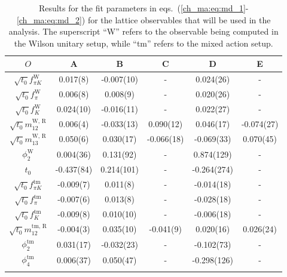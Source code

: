 \begin{longtable}{c | c c c c c}
\label{ch_ma:tab:md}
    ${O}$ & A & B & C & D & E \\
    \toprule
    $\sqrt{t_0}f_{\pi K}^{\textrm{W}}$ & 0.017(8) & -0.007(10) & - & 0.024(26) & - \\ 
    $\sqrt{t_0}f_{\pi}^{\textrm{W}}$ & 0.006(8) & 0.008(9) & - & 0.020(26) & - \\ 
    $\sqrt{t_0}f_{K}^{\textrm{W}}$ & 0.024(10) & -0.016(11) & - & 0.022(27) & - \\ 
    $\sqrt{t_0}m_{12}^{\textrm{W, R}}$ & 0.006(4) & -0.033(13) & 0.090(12) & 0.046(17) & -0.074(27) \\ 
    $\sqrt{t_0}m_{13}^{\textrm{W, R}}$ & 0.050(6) & 0.030(17) & -0.066(18) & -0.069(33) & 0.070(45) \\ 
    $\phi_2^{\textrm{W}}$ & 0.004(36) & 0.131(92) & - & 0.874(129) & - \\ 
    $t_0$ & -0.437(84) & 0.214(101) & - & -0.264(274) & - \\ 
    \midrule
    $\sqrt{t_0}f_{\pi K}^{\textrm{tm}}$ & -0.009(7) & 0.011(8) & - & -0.014(18) & - \\ 
    $\sqrt{t_0}f_{\pi}^{\textrm{tm}}$ & -0.007(6) & 0.013(8) & - & -0.028(18) & - \\ 
    $\sqrt{t_0}f_{K}^{\textrm{tm}}$ & -0.009(8) & 0.010(10) & - & -0.006(18) & - \\ 
    $\sqrt{t_0}m_{12}^{\textrm{tm, R}}$ & -0.004(3) & 0.035(10) & -0.041(9) & 0.020(16) & 0.026(24) \\ 
    $\phi_2^{\textrm{tm}}$ & 0.031(17) & -0.032(23) & - & -0.102(73) & - \\ 
    $\phi_4^{\textrm{tm}}$ & 0.006(37) & 0.050(47) & - & -0.298(126) & - \\ 
    \bottomrule
    \caption{Results for the fit parameters in eqs.~(\ref{ch_ma:eq:md_1}-\ref{ch_ma:eq:md_2}) for the lattice observables that will be used in the analysis. The superscript ``W'' refers to the observable being computed in the Wilson unitary setup, while ``tm'' refers to the mixed action setup.}
\end{longtable}

